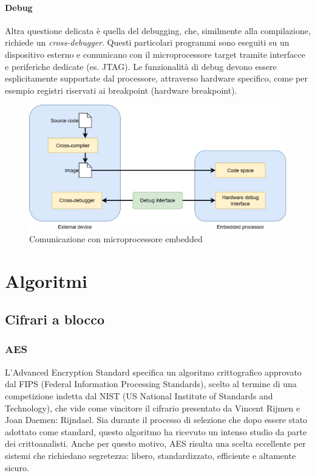 \documentclass[target=bach,aauheader=,style=]{thud}
\begin{document}
			\subsubsection{Debug}
			Altra questione delicata è quella del debugging, che, similmente alla compilazione, richiede un \textit{cross-debugger}. Questi particolari programmi sono eseguiti su un dispositivo esterno e comunicano con il microprocessore target tramite interfacce e periferiche dedicate (es. JTAG).
			Le funzionalità di debug devono essere esplicitamente supportate dal processore, attraverso hardware specifico, come per esempio registri riservati ai breakpoint (hardware breakpoint).
			
			\begin{figure}[h]
				\centering
				\includegraphics[width=0.5\linewidth]{img/cross-compiler-debugger.jpg}
				\caption{Comunicazione con microprocessore embedded}
				\label{fig:placeholder}
			\end{figure}
			    		
\chapter{Algoritmi}
	\section{Cifrari a blocco}
		\subsection{AES\cite{aes}}
		L'Advanced Encryption Standard specifica un algoritmo crittografico approvato dal FIPS (Federal Information Processing Standards), scelto al termine di una competizione indetta dal NIST (US National Institute of Standards and Technology), che vide come vincitore il cifrario presentato da Vincent Rijmen e Joan Daemen: Rijndael. Sia durante il processo di selezione che dopo essere stato adottato come standard, questo algoritmo ha ricevuto un intenso studio da parte dei crittoanalisti. Anche per questo motivo, AES risulta una scelta eccellente per sistemi che richiedano segretezza: libero, standardizzato, efficiente e altamente sicuro. \cite{moderncrypto}
\end{document}

